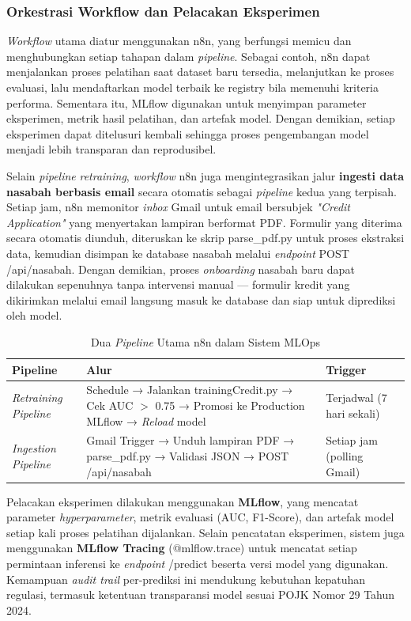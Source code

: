 \subsubsection{Orkestrasi Workflow dan Pelacakan Eksperimen}
\textit{Workflow} utama diatur menggunakan n8n, yang berfungsi memicu dan menghubungkan setiap tahapan dalam \textit{pipeline}. Sebagai contoh, n8n dapat menjalankan proses pelatihan saat dataset baru tersedia, melanjutkan ke proses evaluasi, lalu mendaftarkan model terbaik ke registry bila memenuhi kriteria performa. Sementara itu, MLflow digunakan untuk menyimpan parameter eksperimen, metrik hasil pelatihan, dan artefak model. Dengan demikian, setiap eksperimen dapat ditelusuri kembali sehingga proses pengembangan model menjadi lebih transparan dan reprodusibel.


Selain \textit{pipeline} \textit{retraining}, \textit{workflow} n8n juga mengintegrasikan jalur \textbf{ingesti data nasabah berbasis email} secara otomatis sebagai \textit{pipeline} kedua yang terpisah. Setiap jam, n8n memonitor \textit{inbox} Gmail untuk email bersubjek \textit{"Credit Application"} yang menyertakan lampiran berformat PDF. Formulir yang diterima secara otomatis diunduh, diteruskan ke skrip parse\_pdf.py untuk proses ekstraksi data, kemudian disimpan ke database nasabah melalui \textit{endpoint} POST /api/nasabah. Dengan demikian, proses \textit{onboarding} nasabah baru dapat dilakukan sepenuhnya tanpa intervensi manual --- formulir kredit yang dikirimkan melalui email langsung masuk ke database dan siap untuk diprediksi oleh model.

\begin{table}[H]
\centering
\caption{Dua \textit{Pipeline} Utama n8n dalam Sistem MLOps}
\label{tab:n8n-pipelines}
\begin{tabularx}{\textwidth}{|p{3.5cm}|X|p{3.5cm}|}
\hline
\textbf{Pipeline} & \textbf{Alur} & \textbf{Trigger} \\ \hline
\textit{Retraining Pipeline} & Schedule → Jalankan trainingCredit.py → Cek AUC $>$ 0.75 → Promosi ke Production MLflow → \textit{Reload} model & Terjadwal (7 hari sekali) \\ \hline
\textit{Ingestion Pipeline} & Gmail Trigger → Unduh lampiran PDF → parse\_pdf.py → Validasi JSON → POST /api/nasabah & Setiap jam (polling Gmail) \\ \hline
\end{tabularx}
\end{table}

Pelacakan eksperimen dilakukan menggunakan \textbf{MLflow}, yang mencatat parameter \textit{hyperparameter}, metrik evaluasi (AUC, F1-Score), dan artefak model setiap kali proses pelatihan dijalankan. Selain pencatatan eksperimen, sistem juga menggunakan \textbf{MLflow Tracing} (@mlflow.trace) untuk mencatat setiap permintaan inferensi ke \textit{endpoint} /predict beserta versi model yang digunakan. Kemampuan \textit{audit trail} per-prediksi ini mendukung kebutuhan kepatuhan regulasi, termasuk ketentuan transparansi model sesuai POJK Nomor 29 Tahun 2024.

